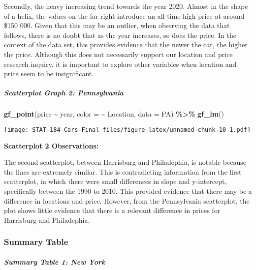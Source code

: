 \documentclass[
]{article}
\newenvironment{Shaded}{\begin{snugshade}}{\end{snugshade}}
\newcommand{\AttributeTok}[1]{\textcolor[rgb]{0.13,0.29,0.53}{#1}}
\newcommand{\FunctionTok}[1]{\textcolor[rgb]{0.13,0.29,0.53}{\textbf{#1}}}
\newcommand{\NormalTok}[1]{#1}
\newcommand{\SpecialCharTok}[1]{\textcolor[rgb]{0.81,0.36,0.00}{\textbf{#1}}}
\begin{document}
Secondly, the heavy increasing trend towards the year 2020. Almost in
the shape of a helix, the values on the far right introduce an
all-time-high price at around \$150 000. Given that this may be an
outlier, when observing the data that follows, there is no doubt that as
the year increases, so does the price. In the context of the data set,
this provides evidence that the newer the car, the higher the price.
Although this does not necessarily support our location and price
research inquiry, it is important to explore other variables when
location and price seem to be insignificant.

\hypertarget{scatterplot-graph-2-pennsylvania}{%
\subparagraph{Scatterplot Graph 2:
Pennsylvania}\label{scatterplot-graph-2-pennsylvania}}

\begin{Shaded}
\begin{Highlighting}[]
\FunctionTok{gf\_point}\NormalTok{(price }\SpecialCharTok{\textasciitilde{}}\NormalTok{ year, }\AttributeTok{color =} \SpecialCharTok{\textasciitilde{}}\NormalTok{ Location, }\AttributeTok{data =}\NormalTok{ PA) }\SpecialCharTok{\%\textgreater{}\%}
  \FunctionTok{gf\_lm}\NormalTok{()}
\end{Highlighting}
\end{Shaded}

\texttt{[image: STAT-184-Cars-Final\_files/figure-latex/unnamed-chunk-10-1.pdf]}

\textbf{Scatterplot 2 Observations:}

The second scatterplot, between Harrisburg and Philadephia, is notable
because the lines are extremely similar. This is contradicting
information from the first scatterplot, in which there were small
differences in slope and y-intercept, specifically between the 1990 to
2010. This provided evidence that there may be a difference in locations
and price. However, from the Pennsylvania scatterplot, the plot shows
little evidence that there is a relevant difference in prices for
Harrisburg and Philadephia.

\hypertarget{summary-table}{%
\subsubsection{\texorpdfstring{\textbf{Summary
Table}}{Summary Table}}\label{summary-table}}

\hypertarget{summary-table-1-new-york}{%
\subparagraph{Summary Table 1: New
York}\label{summary-table-1-new-york}}
\end{document}
